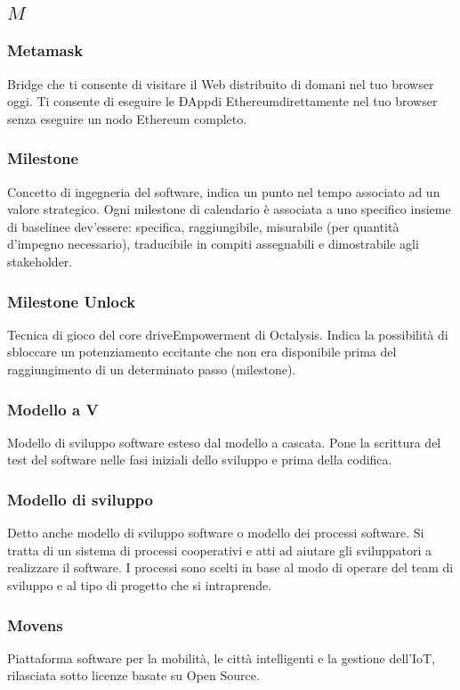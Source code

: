 \subsection*{\quad$M\quad$}
\subsubsection*{Metamask}
Bridge che ti consente di visitare il Web distribuito di domani nel tuo browser oggi. Ti consente di eseguire le ÐApp\glosp di Ethereum\glosp direttamente nel tuo browser senza eseguire un nodo Ethereum completo.

\subsubsection*{Milestone}
Concetto di ingegneria del software, indica un punto nel tempo associato ad un valore strategico. Ogni milestone di calendario è associata a uno specifico insieme di baseline\glo e dev'essere: specifica, raggiungibile, misurabile (per quantità d’impegno necessario), traducibile in compiti assegnabili e dimostrabile agli stakeholder\glo.

\subsubsection*{Milestone Unlock}
Tecnica di gioco del core drive\glosp Empowerment di Octalysis\glo. Indica la possibilità di sbloccare un potenziamento eccitante che non era disponibile prima del raggiungimento di un determinato passo (milestone).

\subsubsection*{Modello a V}
Modello di sviluppo software esteso dal modello a cascata. Pone la scrittura del test del software nelle fasi iniziali dello sviluppo e prima della codifica.

\subsubsection*{Modello di sviluppo}
Detto anche modello di sviluppo software o modello dei processi software. Si tratta di un sistema di processi cooperativi e atti ad aiutare gli sviluppatori a realizzare il software. I processi sono scelti in base al modo di operare del team di sviluppo e al tipo di progetto che si intraprende.

\subsubsection*{Movens}
Piattaforma software per la mobilità, le città intelligenti e la gestione dell'IoT, rilasciata sotto licenze basate su Open Source\glo.

